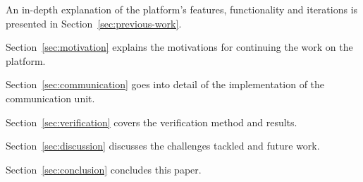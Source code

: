An in-depth explanation of the platform's features, functionality and iterations is presented in Section~\ref{sec:previous-work}.


Section~\ref{sec:motivation} explains the motivations for continuing the work on the platform.

Section~\ref{sec:communication} goes into detail of the implementation of the communication unit.

Section~\ref{sec:verification} covers the verification method and results.

Section~\ref{sec:discussion} discusses the challenges tackled and future work.

Section~\ref{sec:conclusion} concludes this paper.

